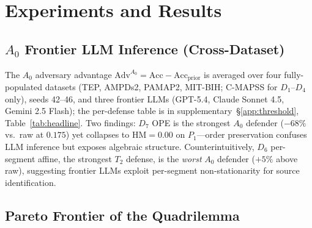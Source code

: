 \documentclass{article}
\theoremstyle{remark}
\newcommand{\Adv}{\mathrm{Adv}}
\begin{document}
\section{Experiments and Results}
\label{sec:experiments}

\subsection{$A_0$ Frontier LLM Inference (Cross-Dataset)}
\label{sec:a0results}
The $A_0$ adversary advantage $\Adv^{A_0} = \mathrm{Acc} - \mathrm{Acc}_\mathrm{prior}$ is averaged over four fully-populated datasets (TEP, AMPDs2, PAMAP2, MIT-BIH; C-MAPSS for $D_1$--$D_4$ only), seeds 42--46, and three frontier LLMs (GPT-5.4, Claude Sonnet 4.5, Gemini 2.5 Flash); the per-defense table is in supplementary~\S\ref{app:threshold}, Table~\ref{tab:headline}. Two findings: $D_7$ OPE is the strongest $A_0$ defender ($-68\%$ vs.\ raw at $0.175$) yet collapses to $\mathrm{HM} = 0.00$ on $P_1$---order preservation confuses LLM inference but exposes algebraic structure. Counterintuitively, $D_6$ per-segment affine, the strongest $T_2$ defense, is the \emph{worst} $A_0$ defender ($+5\%$ above raw), suggesting frontier LLMs exploit per-segment non-stationarity for source identification.

\subsection{Pareto Frontier of the Quadrilemma}
\end{document}
